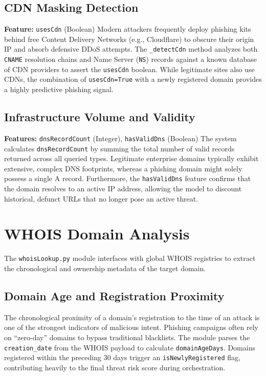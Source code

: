 \subsection{CDN Masking Detection}\label{cdn-masking-detection}

\textbf{Feature:} \texttt{usesCdn} (Boolean) Modern attackers frequently
deploy phishing kits behind free Content Delivery Networks (e.g.,
Cloudflare) to obscure their origin IP and absorb defensive DDoS
attempts. The \texttt{\_detectCdn} method analyzes both \texttt{CNAME}
resolution chains and Name Server (\texttt{NS}) records against a known
database of CDN providers to assert the \texttt{usesCdn} boolean. While
legitimate sites also use CDNs, the combination of \texttt{usesCdn=True}
with a newly registered domain provides a highly predictive phishing
signal.

\subsection{Infrastructure Volume and
Validity}\label{infrastructure-volume-and-validity}

\textbf{Features:} \texttt{dnsRecordCount} (Integer),
\texttt{hasValidDns} (Boolean) The system calculates
\texttt{dnsRecordCount} by summing the total number of valid records
returned across all queried types. Legitimate enterprise domains
typically exhibit extensive, complex DNS footprints, whereas a phishing
domain might solely possess a single A record. Furthermore, the
\texttt{hasValidDns} feature confirms that the domain resolves to an
active IP address, allowing the model to discount historical, defunct
URLs that no longer pose an active threat.

\section{WHOIS Domain Analysis}\label{whois-domain-analysis}

The \texttt{whoisLookup.py} module interfaces with global WHOIS
registries to extract the chronological and ownership metadata of the
target domain.

\subsection{Domain Age and Registration
Proximity}\label{domain-age-and-registration-proximity}

The chronological proximity of a domain's registration to the time of an
attack is one of the strongest indicators of malicious intent. Phishing
campaigns often rely on ``zero-day'' domains to bypass traditional
blacklists. The module parses the \texttt{creation\_date} from the WHOIS
payload to calculate \texttt{domainAgeDays}. Domains registered within
the preceding 30 days trigger an \texttt{isNewlyRegistered} flag,
contributing heavily to the final threat risk score during
orchestration.

